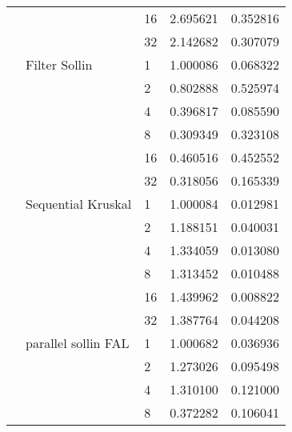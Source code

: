 \begin{tabular}{lllrr}
                                                       &                     & 16 &  2.695621 &  0.352816 \\
                                                       &                     & 32 &  2.142682 &  0.307079 \\
                                                       & Filter Sollin & 1  &  1.000086 &  0.068322 \\
                                                       &                     & 2  &  0.802888 &  0.525974 \\
                                                       &                     & 4  &  0.396817 &  0.085590 \\
                                                       &                     & 8  &  0.309349 &  0.323108 \\
                                                       &                     & 16 &  0.460516 &  0.452552 \\
                                                       &                     & 32 &  0.318056 &  0.165339 \\
                                                       & Sequential Kruskal & 1  &  1.000084 &  0.012981 \\
                                                       &                     & 2  &  1.188151 &  0.040031 \\
                                                       &                     & 4  &  1.334059 &  0.013080 \\
                                                       &                     & 8  &  1.313452 &  0.010488 \\
                                                       &                     & 16 &  1.439962 &  0.008822 \\
                                                       &                     & 32 &  1.387764 &  0.044208 \\
                                                       & parallel sollin FAL & 1  &  1.000682 &  0.036936 \\
                                                       &                     & 2  &  1.273026 &  0.095498 \\
                                                       &                     & 4  &  1.310100 &  0.121000 \\
                                                       &                     & 8  &  0.372282 &  0.106041 \\

\end{tabular}
